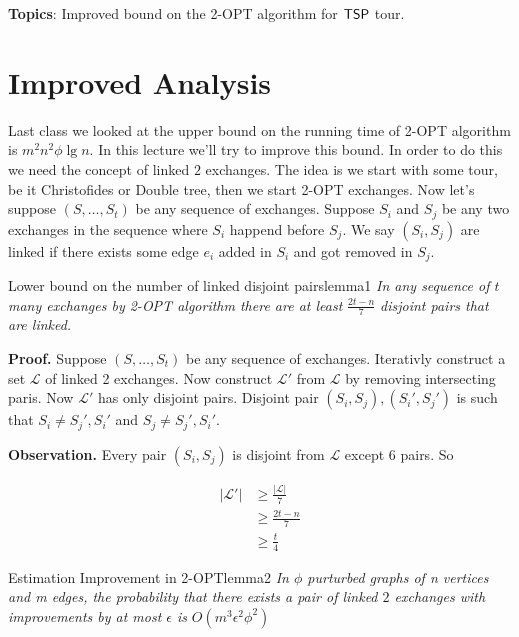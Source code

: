 \documentclass[12pt, a4paper]{article}
\newcommand{\tsp}{{\sf TSP}}
\begin{document}
\MakeScribeTop

\textbf{Topics}: Improved bound on the 2-{\sf OPT} algorithm for $\tsp$ tour.

\section{Improved Analysis}

Last class we looked at the upper bound on the running time of 2\textsf{-OPT} algorithm 
is $m^2n^2\phi \lg n$. In this lecture we'll try to improve this bound. In order to do this 
we need the concept of linked $2$ exchanges. The idea is we start with some tour, be it 
Christofides or Double tree, then we start 2-{\sf OPT} exchanges. Now let's suppose
$(S, \dots, S_t)$ be any sequence of exchanges. Suppose $S_i$ and $S_j$ be any two exchanges in the
sequence where $S_i$ happend before $S_j$. We say $(S_i, S_j)$ are linked
if there exists some edge $e_i$ added in $S_i$ and got removed in $S_j$.

\begin{lemma}{Lower bound on the number of linked disjoint pairs}{lemma1}
    \textit{In any sequence of $t$ many exchanges by 2-OPT algorithm there are at least}
    $\frac{2t - n}{7}$ \textit{ disjoint pairs that are linked.}
\end{lemma}

\textbf{Proof.} Suppose $(S, \dots, S_t)$ be any sequence of exchanges.
Iterativly construct a set $\mathcal{L}$ of linked 2 exchanges. Now construct
$\mathcal{L}'$ from $\mathcal{L}$ by removing intersecting paris. Now
$\mathcal{L}'$ has only disjoint pairs. Disjoint pair $(S_i, S_j), (S_i', S_j')$ 
is such that $S_i \neq S_j', S_i'$ and $S_j \neq S_j', S_i'$.

\textbf{Observation.} Every pair $(S_i, S_j)$ is disjoint from $\mathcal{L}$
except $6$ pairs. So

\begin{align*}
    \vert \mathcal{L}' \vert &\geq \frac{\vert \mathcal{L} \vert}{7}\\
    &\geq \frac{2t - n}{7}\\
    &\geq \frac{t}{4}
\end{align*}

\begin{lemma}{Estimation Improvement in 2-OPT}{lemma2}
    \textit{In $\phi$ purturbed graphs of n vertices and m edges, the probability that there exists
    a pair of linked $2$ exchanges with improvements by at most $\epsilon$ is} $O(m^3 \epsilon^2 \phi^2)$
\end{lemma}
\end{document}

